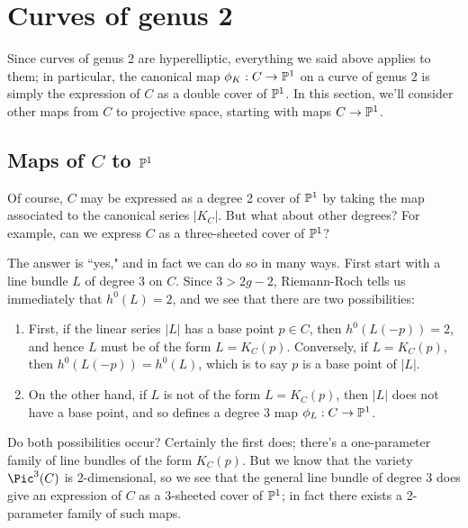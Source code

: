 \section{Curves of genus 2}


Since  curves of genus 2 are hyperelliptic, everything we said above applies to them; in particular, the canonical map $\phi_K : C \to \PP^1$ on a curve of genus 2 is simply the expression of $C$ as a double cover of $\PP^1$. In this section, we'll consider other maps from $C$ to projective space, starting with maps $C \to \PP^1$.

\subsection{Maps of $C$ to $\PP^1$}\label{genus 2 pencil}

Of course, $C$ may be expressed as a degree 2 cover of $\PP^1$ by taking the map associated to the canonical series $|K_C|$. But what about other degrees? For example, can we express $C$ as a three-sheeted cover of $\PP^1$?

The answer is ``yes," and in fact we can do so in many ways. First start with a line bundle $L$ of degree 3 on $C$. Since $3 > 2g-2$, Riemann-Roch tells us immediately that $h^0(L) = 2$, and we see that there are two possibilities:

\begin{enumerate}
\item First, if the linear series $|L|$ has a base point $p \in C$, then $h^0(L(-p)) = 2$, and hence $L$ must be of the form $L = K_C(p)$. Conversely, if $L = K_C(p)$, then $h^0(L(-p)) = h^0(L)$, which is to say $p$ is a base point of $|L|$.
\item On the other hand, if $L$ is not of the form $L = K_C(p)$, then $|L|$ does not have a base point, and so defines a degree 3 map $\phi_L : C \to \PP^1$.
\end{enumerate}

Do both possibilities occur? Certainly the first does; there's a one-parameter family of line bundles of the form $K_C(p)$. But we know that the variety $\Pic^3(C)$ is 2-dimensional, so we see that the general line bundle of degree 3 does  give an expression of $C$ as a 3-sheeted cover of $\PP^1$; in fact there exists a 2-parameter family of such maps.

